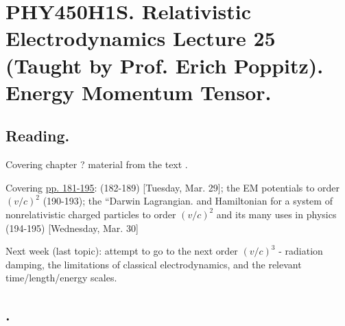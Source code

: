 
%
\usepackage{cancel}

\chapter{PHY450H1S.  Relativistic Electrodynamics Lecture 25 (Taught by Prof. Erich Poppitz).  Energy Momentum Tensor.}
\label{chap:relativisticElectrodynamicsL25}
{}
\date{Mar 31, 2011}

\beginArtNoToc

\section{Reading.}

Covering chapter ? material from the text \cite{landau1980classical}.

Covering \href{http://www.physics.utoronto.ca/~poppitz/epoppitz/PHY450_files/RelEMpp181-195.pdf}{pp. 181-195}: (182-189) [Tuesday, Mar. 29]; the EM potentials to order $(v/c)^2$ (190-193); the ``Darwin Lagrangian.  and Hamiltonian for a system of nonrelativistic charged particles to order $(v/c)^2$ and its many uses in physics (194-195) [Wednesday, Mar. 30]

Next week (last topic): attempt to go to the next order $(v/c)^3$ - radiation damping, the limitations of classical electrodynamics, and the relevant time/length/energy scales.

\section{.}

\EndArticle
